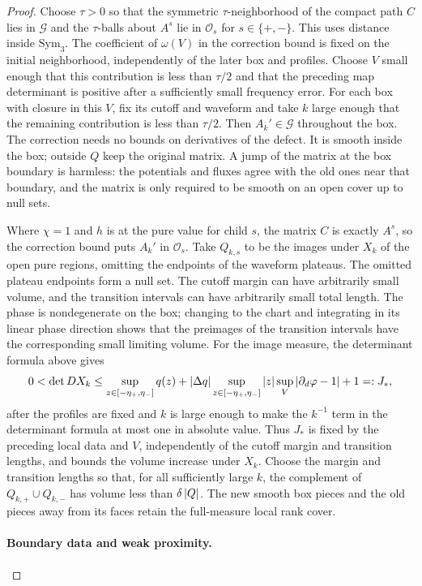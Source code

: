 \begin{proof}
Choose $\tau>0$ so that the symmetric $\tau$-neighborhood of the compact
path $C$ lies in $\mathcal G$ and the $\tau$-balls about $A^s$ lie in
$\mathcal O_s$ for $s\in\{+,-\}$. This uses distance inside $\mathrm{Sym}_3$.
The coefficient of $\omega(V)$ in the correction bound is fixed on the
initial neighborhood, independently of the later box and profiles.
Choose $V$ small enough that this contribution is less than $\tau/2$
and that the preceding map determinant is positive after a sufficiently
small frequency error. For each box with closure in this $V$, fix its
cutoff and waveform and take $k$ large enough that the remaining
contribution is less than $\tau/2$. Then $A_k'\in\mathcal G$ throughout
the box. The correction needs no bounds on derivatives of the defect.
It is smooth inside the box; outside $Q$ keep the original matrix.
A jump of the matrix at the box boundary is harmless: the potentials
and fluxes agree with the old ones near that boundary, and the matrix
is only required to be smooth on an open cover up to null sets.

Where $\chi=1$ and $h$ is at the pure value for child $s$, the matrix
$C$ is exactly $A^s$, so the correction bound puts $A_k'$ in
$\mathcal O_s$. Take $Q_{k,s}$ to be the images under $X_k$ of the
open pure regions, omitting the endpoints of the waveform plateaus.
The omitted plateau endpoints form a null set. The cutoff margin can
have arbitrarily small volume, and the transition intervals can have
arbitrarily small total length. The phase is nondegenerate on the box;
changing to the chart and integrating in its linear phase direction
shows that the preimages of the transition intervals have the
corresponding small limiting volume. For the image measure, the
determinant formula above gives
\[
 0<\det DX_k\le
 \sup_{z\in[-\eta_+,\eta_-]}q(z)
 +\left\lvert \Delta q\right\rvert\sup_{z\in[-\eta_+,\eta_-]}\left\lvert z\right\rvert
       \sup_V\left\lvert \partial_d\varphi-1\right\rvert+1=:J_*,
\]
after the profiles are fixed and $k$ is large enough to make the $k^{-1}$
term in the determinant formula at most one in absolute value. Thus $J_*$ is
fixed by the preceding local data and $V$, independently of the cutoff margin and
transition lengths, and bounds the volume increase under $X_k$.
Choose the margin and transition lengths so that, for all sufficiently large $k$, the
complement of $Q_{k,+}\cup Q_{k,-}$ has volume less than
$\delta\left\lvert Q\right\rvert$. The new smooth box pieces and the old pieces away
from its faces retain the full-measure local rank cover.

\paragraph{Boundary data and weak proximity.}


\end{proof}
